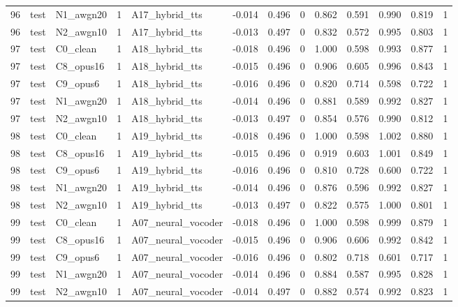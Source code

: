 \begin{tabular}{rllrlrrrrrrrr}
96 & test & N1_awgn20 & 1 & A17_hybrid_tts & -0.014 & 0.496 & 0 & 0.862 & 0.591 & 0.990 & 0.819 & 1 \\
96 & test & N2_awgn10 & 1 & A17_hybrid_tts & -0.013 & 0.497 & 0 & 0.832 & 0.572 & 0.995 & 0.803 & 1 \\
97 & test & C0_clean & 1 & A18_hybrid_tts & -0.018 & 0.496 & 0 & 1.000 & 0.598 & 0.993 & 0.877 & 1 \\
97 & test & C8_opus16 & 1 & A18_hybrid_tts & -0.015 & 0.496 & 0 & 0.906 & 0.605 & 0.996 & 0.843 & 1 \\
97 & test & C9_opus6 & 1 & A18_hybrid_tts & -0.016 & 0.496 & 0 & 0.820 & 0.714 & 0.598 & 0.722 & 1 \\
97 & test & N1_awgn20 & 1 & A18_hybrid_tts & -0.014 & 0.496 & 0 & 0.881 & 0.589 & 0.992 & 0.827 & 1 \\
97 & test & N2_awgn10 & 1 & A18_hybrid_tts & -0.013 & 0.497 & 0 & 0.854 & 0.576 & 0.990 & 0.812 & 1 \\
98 & test & C0_clean & 1 & A19_hybrid_tts & -0.018 & 0.496 & 0 & 1.000 & 0.598 & 1.002 & 0.880 & 1 \\
98 & test & C8_opus16 & 1 & A19_hybrid_tts & -0.015 & 0.496 & 0 & 0.919 & 0.603 & 1.001 & 0.849 & 1 \\
98 & test & C9_opus6 & 1 & A19_hybrid_tts & -0.016 & 0.496 & 0 & 0.810 & 0.728 & 0.600 & 0.722 & 1 \\
98 & test & N1_awgn20 & 1 & A19_hybrid_tts & -0.014 & 0.496 & 0 & 0.876 & 0.596 & 0.992 & 0.827 & 1 \\
98 & test & N2_awgn10 & 1 & A19_hybrid_tts & -0.013 & 0.497 & 0 & 0.822 & 0.575 & 1.000 & 0.801 & 1 \\
99 & test & C0_clean & 1 & A07_neural_vocoder & -0.018 & 0.496 & 0 & 1.000 & 0.598 & 0.999 & 0.879 & 1 \\
99 & test & C8_opus16 & 1 & A07_neural_vocoder & -0.015 & 0.496 & 0 & 0.906 & 0.606 & 0.992 & 0.842 & 1 \\
99 & test & C9_opus6 & 1 & A07_neural_vocoder & -0.016 & 0.496 & 0 & 0.802 & 0.718 & 0.601 & 0.717 & 1 \\
99 & test & N1_awgn20 & 1 & A07_neural_vocoder & -0.014 & 0.496 & 0 & 0.884 & 0.587 & 0.995 & 0.828 & 1 \\
99 & test & N2_awgn10 & 1 & A07_neural_vocoder & -0.014 & 0.497 & 0 & 0.882 & 0.574 & 0.992 & 0.823 & 1 \\
\bottomrule
\end{tabular}
